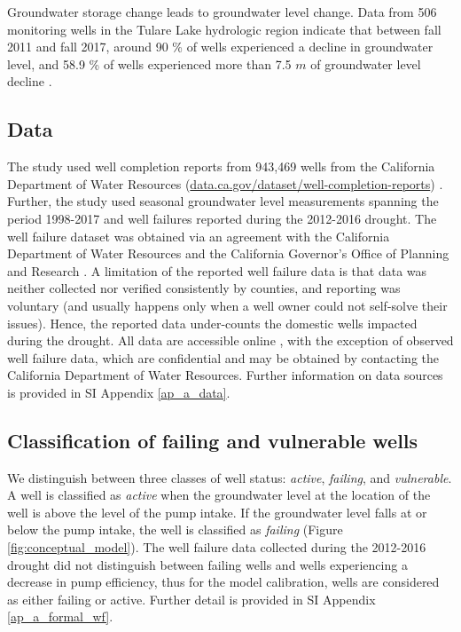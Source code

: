 Groundwater storage change leads to groundwater level change. Data from 506 monitoring wells in the Tulare Lake hydrologic region indicate that between fall 2011 and fall 2017, around 90 \% of wells experienced a decline in groundwater level, and 58.9 \% of wells experienced more than 7.5 $m$ of groundwater level decline \citep{dwrgwl2017}. 



\subsection{Data}
The study used well completion reports from 943,469 wells from the California Department of Water Resources (\hyperlink{https://data.ca.gov/dataset/well-completion-reports}{data.ca.gov/dataset/well-completion-reports}) \citep{oswcr}. Further, the study used seasonal groundwater level measurements \citep{gwl} spanning the period 1998-2017 and well failures reported during the 2012-2016 drought. The well failure dataset was obtained via an agreement with the California Department of Water Resources and the California Governor's Office of Planning and Research \citep{observedDW}. A limitation of the reported well failure data is that data was neither collected nor verified consistently by counties, and reporting was voluntary (and usually happens only when a well owner could not self-solve their issues). Hence, the reported data under-counts the domestic wells impacted during the drought. All data are accessible online \citep{Pauloo2019}, with the exception of observed well failure data, which are confidential and may be obtained by contacting the California Department of Water Resources. Further information on data sources is provided in SI Appendix \ref{ap_a_data}.

\subsection{Classification of failing and vulnerable wells}

We distinguish between three classes of well status: \textit{active}, \textit{failing}, and \textit{vulnerable}. A well is classified as \textit{active} when the groundwater level at the location of the well is above the level of the pump intake. If the groundwater level falls at or below the pump intake, the well is classified as \textit{failing} (Figure \ref{fig:conceptual_model}). The well failure data collected during the 2012-2016 drought did not distinguish between failing wells and wells experiencing a decrease in pump efficiency, thus for the model calibration, wells are considered as either failing or active. Further detail is provided in SI Appendix \ref{ap_a_formal_wf}.

